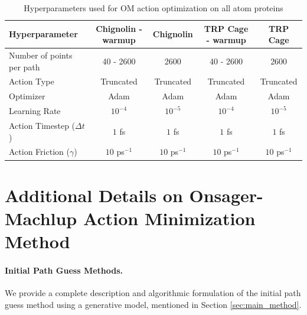 \begin{table}[h]
\caption{Hyperparameters used for OM action optimization on all atom proteins}
\label{tab:om_optimization_details_classical}
\scriptsize
\centering
    \begin{tabular}{lcccc}
        \toprule
        \textbf{Hyperparameter} & \textbf{Chignolin - warmup} & \textbf{Chignolin} & \textbf{TRP Cage - warmup} & \textbf{TRP Cage} \\
        \midrule
        Number of points per path & 40 - 2600 & 2600 & 40 - 2600 & 2600 \\
        Action Type & Truncated & Truncated & Truncated & Truncated \\
        Optimizer & Adam & Adam & Adam & Adam \\
        Learning Rate & $10^{-4}$ & $10^{-5}$ & $10^{-4}$ & $10^{-5}$ \\
        Action Timestep ($\Delta t$) & $1$ fs & $1$ fs & $1$ fs & $1$ fs \\
        Action Friction ($\gamma$) & $10$ ps$^{-1}$ & $10$ ps$^{-1}$ & $10$ ps$^{-1}$ & $10$ ps$^{-1}$ \\
        \bottomrule
    \end{tabular}
\end{table}

\section{Additional Details on Onsager-Machlup Action Minimization Method}
\label{sec:om_details}


\paragraph{Initial Path Guess Methods.}
\label{ape:guesses}
We provide a complete description and algorithmic formulation of the initial path guess method using a generative model, mentioned in Section \ref{sec:main_method}.

